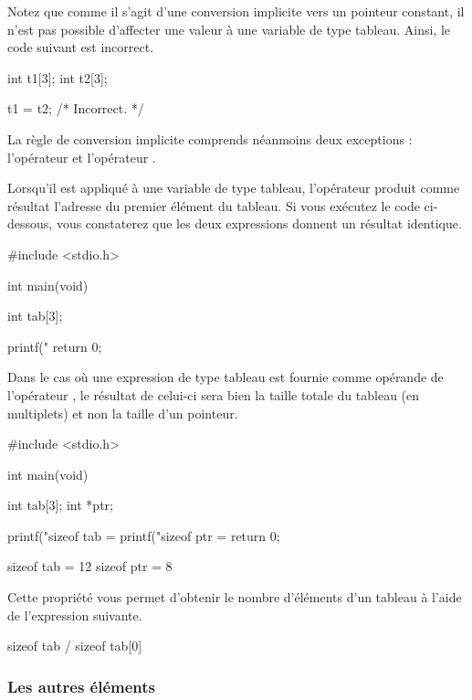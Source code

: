 Notez que comme il s'agit d'une conversion implicite vers un pointeur
constant, il n'est pas possible d'affecter une valeur à une variable de
type tableau. Ainsi, le code suivant est incorrect.

\begin{C}
int t1[3];
int t2[3];

t1 = t2; /* Incorrect. */
\end{C}

La règle de conversion implicite comprends néanmoins deux exceptions :
l'opérateur \mybox{\&} et l'opérateur .

Lorsqu'il est appliqué à une variable de type tableau, l'opérateur
\mybox{\&} produit comme résultat l'adresse du premier élément du
tableau. Si vous exécutez le code ci-dessous, vous constaterez que les
deux expressions donnent un résultat identique.

\begin{C}
#include <stdio.h>


int main(void)
{
    int tab[3];

    printf("%
    return 0;
}
\end{C}

Dans le cas où une expression de type tableau est fournie comme opérande
de l'opérateur , le résultat de celui-ci sera bien la
taille totale du tableau (en multiplets) et non la taille d'un pointeur.

\begin{C}
 #include <stdio.h>


int main(void)
{
    int tab[3];
    int *ptr;

    printf("sizeof tab = %
    printf("sizeof ptr = %
    return 0;
}
\end{C}



\begin{C}
sizeof tab = 12
sizeof ptr = 8
\end{C}

Cette propriété vous permet d'obtenir le nombre d'éléments d'un tableau
à l'aide de l'expression suivante.

\begin{C}
sizeof tab / sizeof tab[0]
\end{C}

\subsubsection{Les autres éléments}
\label{les-autres-elements}


